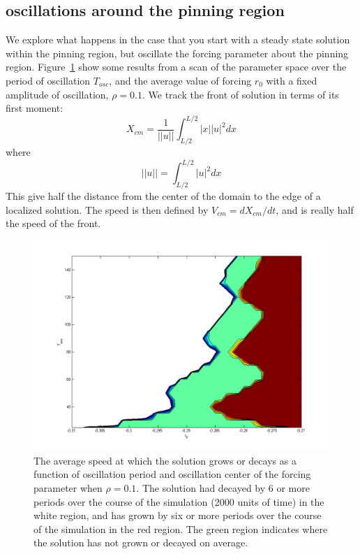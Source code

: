 \documentclass[pre,preprint,superscriptaddress]{revtex4-1}
\begin{document}
\subsection{oscillations around the pinning region}
We explore what happens in the case that you start with a steady state solution within the pinning region, but oscillate the forcing parameter about the pinning region. Figure~\ref{fig:Vcm01} show some results from a scan of the parameter space over the period of oscillation $T_{osc}$, and the average value of forcing $r_0$ with a fixed amplitude of oscillation, $\rho =0.1$.  We track the front of solution in terms of its first moment:
\begin{equation}
X_{cm}=\frac{1}{||u||} \int_{L/2}^{L/2}  |x| |u|^2 dx
\end{equation}
where 
\begin{equation}
||u||= \int_{L/2}^{L/2}  |u|^2 dx
\end{equation}
This give half the distance from the center of the domain to the edge of a localized solution. The speed is then defined by $V_{cm} = d X_{cm}/dt$, and is really half the speed of the front.


\begin{figure}[h!]\center
\includegraphics[width=120mm]{Vcm01.png}
\caption{The average speed at which the solution grows or decays as a function of oscillation period and oscillation center of the forcing parameter when $\rho=0.1$.  The solution had decayed by 6 or more periods over the course of the simulation (2000 units of time) in the white region, and has grown by six or more periods over the course of the simulation  in the red region.  The green region indicates where the solution has not grown or decayed on average.}
    \label{fig:Vcm01}
\end{figure}
\end{document}
